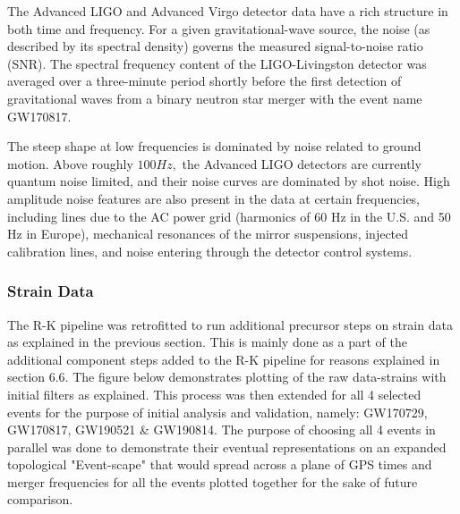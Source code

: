     The Advanced LIGO and Advanced Virgo detector data have a rich structure in both time and frequency. For a given gravitational-wave source, the noise (as described by its spectral density) governs the measured signal-to-noise ratio (SNR). The spectral frequency content of the LIGO-Livingston detector was averaged over a three-minute period shortly before the first detection of gravitational waves from a binary neutron star merger with the event name GW170817.\cite{00.5_GWDetectionNoiseCatalogue}

    The steep shape at low frequencies is dominated by noise related to ground motion. Above roughly
    $100 Hz,$ the Advanced LIGO detectors are currently quantum noise limited, and their
    noise curves are dominated by shot noise. High amplitude noise features are also present in the data at certain frequencies, including lines due to the AC power grid (harmonics of 60 Hz in the U.S. and 50 Hz in Europe), mechanical resonances of the mirror suspensions, injected calibration lines, and noise entering through the detector control systems. \cite{00.1_2012GWAnalysisFormalism} \cite{00.5_GWDetectionNoiseCatalogue} \cite{00.3_GravitationalWaveResearch}

    \subsubsection{Strain Data}

    The R-K pipeline was retrofitted to run additional precursor steps on strain data as explained in the previous section. This is mainly done as a part of the additional component steps added to the R-K pipeline for reasons explained in section 6.6. The figure below demonstrates plotting of the raw data-strains with initial filters as explained. This process was then extended for all 4 selected events for the purpose of initial analysis and validation, namely:  GW170729, GW170817, GW190521 \& GW190814. The purpose of choosing all 4 events in parallel was done to demonstrate their eventual representations on an expanded topological "Event-scape" that would spread across a plane of GPS times and merger frequencies for all the events plotted together for the sake of future comparison.



